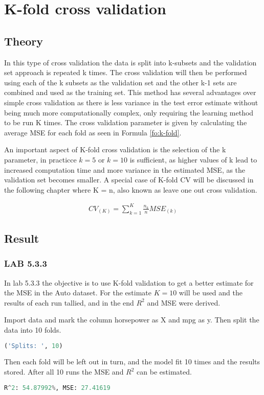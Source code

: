 \section {K-fold cross validation}%
\subsection{Theory}
In this type of cross validation the data is split into k-subsets and the validation set approach is repeated k times. The cross validation will then be performed using each of the k subsets as the validation set and the other k-1 sets are combined and used as the training set. This method has several advantages over simple cross validation as there is less variance in the test error estimate without being much more computationally complex, only requiring the learning method to be run K times. The cross validation parameter is given by calculating the average MSE for each fold as seen in Formula \ref{fo:k-fold}. 

An important aspect of K-fold cross validation is the selection of the k parameter, in practicce $k=5$ or $k=10$ is sufficient, as higher values of k lead to increased computation time and more variance in the estimated MSE, as the validation set becomes smaller. A special case of K-fold CV will be discussed in the following chapter where K = n, also known as leave one out cross validation.

\begin{align}\label{fo:k-fold}
CV_{(K)} = \sum_{k=1}^{K}  \frac {n_{k}}{n}MSE_{(k)}
\end{align}

\subsection{Result}
\subsubsection*{LAB 5.3.3}%
In lab 5.3.3 the objective is to use K-fold validation to get a better estimate for the MSE in the Auto dataset. For the estimate $K=10$ will be used and the results of each run tallied, and in the end $R^2$ and MSE were derived.

Import data and mark the column horsepower as X and mpg as y. Then split the data into 10 folds.
\begin{lstlisting}[language=Python]
('Splits: ', 10)
\end{lstlisting}

Then each fold will be left out in turn, and the model fit 10 times and the results stored. After all 10 runs the MSE and $R^2$ can be estimated.

\begin{lstlisting}[language=Python]
R^2: 54.87992%, MSE: 27.41619
\end{lstlisting}

